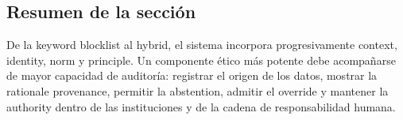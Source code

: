 \subsection{Resumen de la sección}

De la keyword blocklist al hybrid, el sistema incorpora progresivamente context, identity, norm y principle. Un componente ético más potente debe acompañarse de mayor capacidad de auditoría: registrar el origen de los datos, mostrar la rationale provenance, permitir la abstention, admitir el override y mantener la authority dentro de las instituciones y de la cadena de responsabilidad humana.

